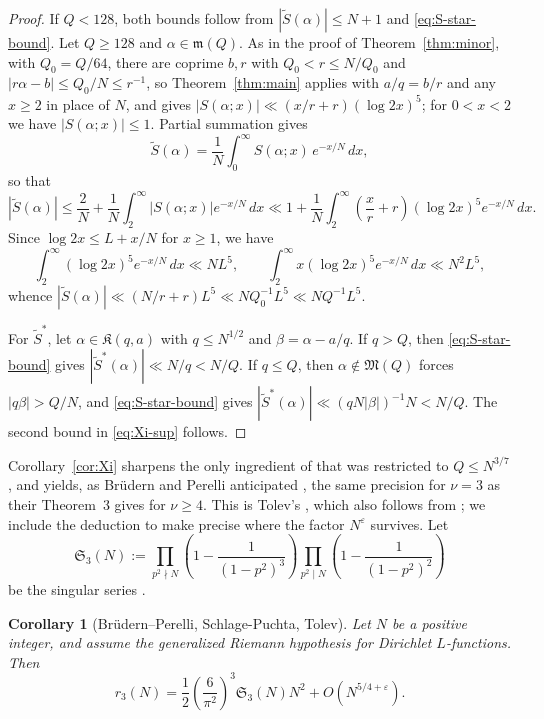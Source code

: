 \documentclass[11pt]{amsart}
\numberwithin{equation}{section}
\numberwithin{figure}{section}
\newtheorem{corollary}[lemma]{Corollary}
\theoremstyle{definition}
\newcommand{\eps}{\varepsilon}
\newcommand{\Major}{\mathfrak{M}}
\newcommand{\Minor}{\mathfrak{m}}
\begin{document}
\begin{proof}
If $Q<128$, both bounds follow from $|\tilde S(\alpha)|\le N+1$ and
\eqref{eq:S-star-bound}.  Let $Q\ge128$ and $\alpha\in\Minor(Q)$.  As in
the proof of Theorem~\ref{thm:minor}, with $Q_0=Q/64$, there are coprime
$b,r$ with $Q_0<r\le N/Q_0$ and $|r\alpha-b|\le Q_0/N\le r^{-1}$, so
Theorem~\ref{thm:main} applies with $a/q=b/r$ and any $x\ge2$ in place of
$N$, and gives $|S(\alpha;x)|\ll(x/r+r)(\log2x)^5$; for $0<x<2$ we have
$|S(\alpha;x)|\le1$.  Partial summation gives
\[
  \tilde S(\alpha)=\frac1N\int_0^\infty S(\alpha;x)\,e^{-x/N}\,dx,
\]
so that
\[
  |\tilde S(\alpha)|\le\frac2N+\frac1N\int_2^\infty|S(\alpha;x)|e^{-x/N}\,dx
  \ll1+\frac1N\int_2^\infty\left(\frac xr+r\right)(\log2x)^5e^{-x/N}\,dx.
\]
Since $\log 2x\le L+x/N$ for $x\ge1$, we have
\[
  \int_2^\infty(\log 2x)^5e^{-x/N}\,dx\ll NL^5,\qquad
  \int_2^\infty x(\log 2x)^5e^{-x/N}\,dx\ll N^2L^5,
\]
whence $|\tilde S(\alpha)|\ll(N/r+r)L^5\ll NQ_0^{-1}L^5\ll NQ^{-1}L^5$.

For $\tilde S^*$, let $\alpha\in\mathfrak K(q,a)$ with $q\le N^{1/2}$ and
$\beta=\alpha-a/q$.  If $q>Q$, then \eqref{eq:S-star-bound} gives
$|\tilde S^*(\alpha)|\ll N/q<N/Q$.  If $q\le Q$, then $\alpha\notin\Major(Q)$
forces $|q\beta|>Q/N$, and \eqref{eq:S-star-bound} gives
$|\tilde S^*(\alpha)|\ll(qN|\beta|)^{-1}N<N/Q$.  The second bound in
\eqref{eq:Xi-sup} follows.
\end{proof}

Corollary~\ref{cor:Xi} sharpens the only ingredient of \cite[Section~5]{BP}
that was restricted to $Q\le N^{3/7}$, and yields, as Br\"udern and
Perelli anticipated \cite[p.~610]{BP}, the same precision for $\nu=3$ as
their Theorem~3 gives for $\nu\ge4$.  This is Tolev's
\cite[Corollary~2]{Tolev}, which also follows from \cite{SP}; we include
the deduction to make precise where the factor $N^{\eps}$ survives.  Let
\begin{equation}\label{eq:singular-series}
  \mathfrak S_3(N):=\prod_{p^2\nmid N}\left(1-\frac1{(1-p^2)^3}\right)
  \prod_{p^2\mid N}\left(1-\frac1{(1-p^2)^2}\right)
\end{equation}
be the singular series \cite[(2)]{BP}.

\begin{corollary}[Br\"udern--Perelli, Schlage-Puchta, Tolev]\label{cor:r3}
Let $N$ be a positive integer, and assume the generalized Riemann
hypothesis for Dirichlet $L$-functions.  Then
\begin{equation}\label{eq:r3}
  r_3(N)=\frac12\left(\frac6{\pi^2}\right)^3\mathfrak S_3(N)N^2
  +O(N^{5/4+\eps}).
\end{equation}
\end{corollary}
\end{document}
